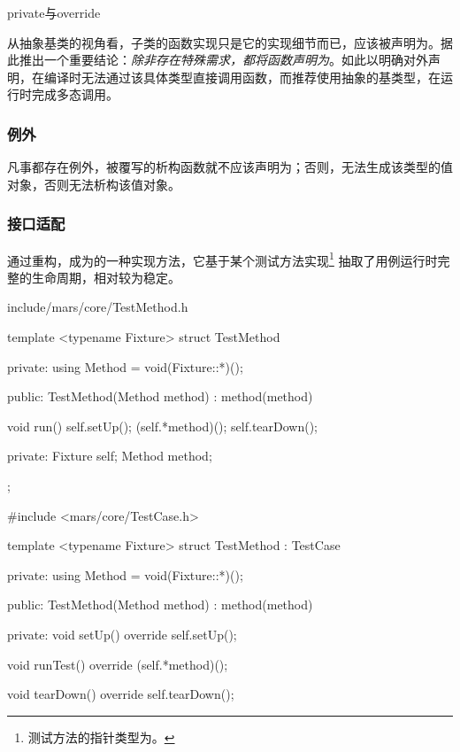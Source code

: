 \begin{content}
\begin{episode}{private与override}
\begin{content}
从抽象基类的视角看，子类的函数实现只是它的实现细节而已，应该被声明为。据此推出一个重要结论：\emph{除非存在特殊需求，都将函数声明为}。如此以明确对外声明，在编译时无法通过该具体类型直接调用函数，而推荐使用抽象的基类型，在运行时完成多态调用。

\subsubsection{例外}

凡事都存在例外，被覆写的析构函数就不应该声明为；否则，无法生成该类型的值对象，否则无法析构该值对象。

\end{content}
\end{episode}

\subsubsection{接口适配}

通过重构，成为的一种实现方法，它基于某个测试方法实现\footnote{测试方法的指针类型为。} 抽取了用例运行时完整的生命周期，相对较为稳定。

\begin{diff}{include/mars/core/TestMethod.h}
 \begin{minicpp}
template <typename Fixture>
struct TestMethod {
private:
  using Method = void(Fixture::*)();

public:
  TestMethod(Method method)
    : method(method) {}

  void run() {
    self.setUp();
    (self.*method)();
    self.tearDown();
  }

private:
  Fixture self;
  Method method;
};
  \end{minicpp}
\tcblower
 \begin{minicpp}
#include <mars/core/TestCase.h>

template <typename Fixture>
struct TestMethod : TestCase {
private:
  using Method = void(Fixture::*)();

public:
  TestMethod(Method method)
    : method(method) {}

private:
  void setUp() override {
    self.setUp();
  }

  void runTest() override {
    (self.*method)();
  }

  void tearDown() override {
    self.tearDown();
  }

}
\end{minicpp}
\end{diff}
\end{content}
